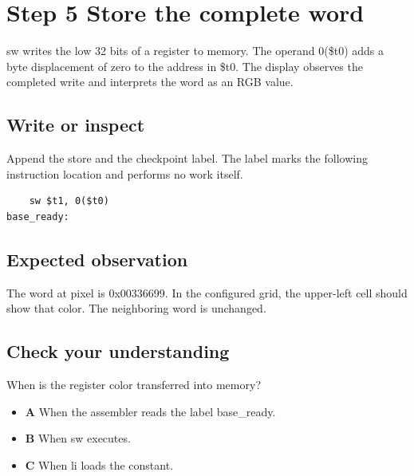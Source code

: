 \section{Step 5 Store the complete
  word}\label{002-single-pixel-s05-step-5-store-the-complete-word}

sw writes the low 32 bits of a register to memory. The operand 0(\$t0)
adds a byte displacement of zero to the address in \$t0. The display
observes the completed write and interprets the word as an RGB value.

\subsection{Write or
  inspect}\label{002-single-pixel-s05-write-or-inspect}

Append the store and the checkpoint label. The label marks the following
instruction location and performs no work itself.

\begin{verbatim}
    sw $t1, 0($t0)
base_ready:
\end{verbatim}

\subsection{Expected
  observation}\label{002-single-pixel-s05-expected-observation}

The word at pixel is 0x00336699. In the configured grid, the upper-left
cell should show that color. The neighboring word is unchanged.

\subsection{Check your
  understanding}\label{002-single-pixel-s05-check-your-understanding}

When is the register color transferred into memory?

\begin{itemize}
  \tightlist
  \item
        \textbf{A} When the assembler reads the label base\_ready.
  \item
        \textbf{B} When sw executes.
  \item
        \textbf{C} When li loads the constant.
\end{itemize}
